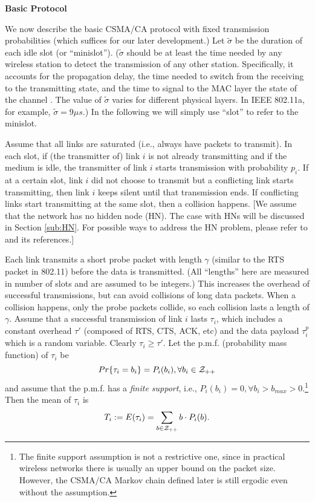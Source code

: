\documentclass{IEEEtran}
\begin{document}
{\bf Basic Protocol}\medskip{}


We now describe the basic CSMA/CA protocol with fixed transmission
probabilities (which suffices for our later development.) Let $\tilde{\sigma}$
be the duration of each idle slot (or {}``minislot''). ($\tilde{\sigma}$
should be at least the time needed by any wireless station to detect
the transmission of any other station. Specifically, it accounts for
the propagation delay, the time needed to switch from the receiving
to the transmitting state, and the time to signal to the MAC layer
the state of the channel \cite{Bianchi}. The value of $\tilde{\sigma}$
varies for different physical layers. In IEEE 802.11a, for example,
$\tilde{\sigma}=9\mu s$.) In the following we will simply use {}``slot''
to refer to the minislot. 

Assume that all links are saturated (i.e., always have packets to
transmit). In each slot, if (the transmitter of) link $i$ is not
already transmitting and if the medium is idle, the transmitter of
link $i$ starts transmission with probability $p_{i}$. If at a certain
slot, link $i$ did not choose to transmit but a conflicting link
starts transmitting, then link $i$ keeps silent until that transmission
ends. If conflicting links start transmitting at the same slot, then
a collision happens. {[}We assume that the network has no hidden node
(HN). The case with HNs will be discussed in Section \ref{sub:HN}.
For possible ways to address the HN problem, please refer to \cite{Jiang-Liew}
and its references.] 

Each link transmits a short probe packet with length $\gamma$ (similar
to the RTS packet in 802.11) before the data is transmitted. (All
{}``lengths'' here are measured in number of slots and are assumed
to be integers.) This increases the overhead of successful transmissions,
but can avoid collisions of long data packets. When a collision happens,
only the probe packets collide, so each collision lasts a length of
$\gamma$. Assume that a successful transmission of link $i$ lasts
$\tau_{i}$, which includes a constant overhead $\tau'$ (composed
of RTS, CTS, ACK, etc) and the data payload $\tau_{i}^{p}$ which
is a random variable. Clearly $\tau_{i}\ge\tau'$. Let the p.m.f.
(probability mass function) of $\tau_{i}$ be \begin{equation}
Pr\{\tau_{i}=b_{i}\}=P_{i}(b_{i}),\forall b_{i}\in{\cal Z}_{++}\label{eq:pmf}\end{equation}
and assume that the p.m.f. has a \emph{finite support}, i.e., $P_{i}(b_{i})=0,\forall b_{i}>b_{max}>0$.\textcolor{blue}{}\footnote{The finite support assumption is not a restrictive one, since in practical
wireless networks there is usually an upper bound on the packet size.
However, the CSMA/CA Markov chain defined later is still ergodic even
without the assumption.}\textcolor{blue}{ }Then the mean of $\tau_{i}$ is \begin{equation}
T_{i}:=E(\tau_{i})=\sum_{b\in{\cal Z}_{++}}b\cdot P_{i}(b).\label{eq:T_i}\end{equation}
\end{document}
